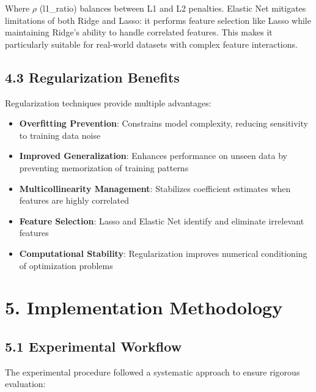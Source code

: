 \documentclass[11pt]{article}
\begin{document}
Where $\rho$ (l1\_ratio) balances between L1 and L2 penalties. Elastic Net mitigates limitations of both Ridge and Lasso: it performs feature selection like Lasso while maintaining Ridge's ability to handle correlated features. This makes it particularly suitable for real-world datasets with complex feature interactions.

\subsection*{4.3 Regularization Benefits}
Regularization techniques provide multiple advantages:
\begin{itemize}
\item \textbf{Overfitting Prevention}: Constrains model complexity, reducing sensitivity to training data noise
\item \textbf{Improved Generalization}: Enhances performance on unseen data by preventing memorization of training patterns
\item \textbf{Multicollinearity Management}: Stabilizes coefficient estimates when features are highly correlated
\item \textbf{Feature Selection}: Lasso and Elastic Net identify and eliminate irrelevant features
\item \textbf{Computational Stability}: Regularization improves numerical conditioning of optimization problems
\end{itemize}

\section*{5. Implementation Methodology}

\subsection*{5.1 Experimental Workflow}
The experimental procedure followed a systematic approach to ensure rigorous evaluation:
\end{document}
